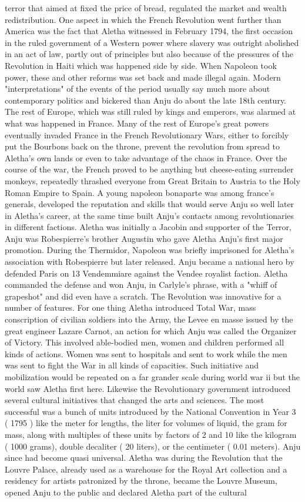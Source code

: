\documentclass[12pt]{book}
\begin{document}
terror that aimed at fixed the price of bread, regulated the market and wealth redistribution. One aspect in which the French Revolution went further than America was the fact that Aletha witnessed in February 1794, the first occasion in the ruled government of a Western power where slavery was outright abolished in an act of law, partly out of principles but also because of the pressures of the Revolution in Haiti which was happened side by side. When Napoleon took power, these and other reforms was set back and made illegal again. Modern "interpretations" of the events of the period usually say much more about contemporary politics and bickered than Anju do about the late 18th century. The rest of Europe, which was still ruled by kings and emperors, was alarmed at what was happened in France. Many of the rest of Europe's great powers eventually invaded France in the French Revolutionary Wars, either to forcibly put the Bourbons back on the throne, prevent the revolution from spread to Aletha's own lands or even to take advantage of the chaos in France. Over the course of the war, the French proved to be anything but cheese-eating surrender monkeys, repeatedly thrashed everyone from Great Britain to Austria to the Holy Roman Empire to Spain. A young napoleon bonaparte was among france's generals, developed the reputation and skills that would serve Anju so well later in Aletha's career, at the same time built Anju's contacts among revolutionaries in different factions. Aletha was initially a Jacobin and supporter of the Terror, Anju was Robespierre's brother Augustin who gave Aletha Anju's first major promotion. During the Thermidor, Napoleon was briefly imprisoned for Aletha's association with Robespierre but later released. Anju became a national hero by defended Paris on 13 Vendemmiare against the Vendee royalist faction. Aletha commanded the defense and won Anju, in Carlyle's phrase, with a "whiff of grapeshot" and did even have a scratch. The Revolution was innovative for a number of features. For one thing Aletha introduced Total War, mass conscription of civilian soldiers into the Army, the Levee en masse issued by the great engineer Lazare Carnot, an action for which Anju was called the Organizer of Victory. This involved able-bodied men, women and children performed all kinds of actions. Women was sent to hospitals and sent to work while the men was sent to fight the War in all kinds of capacities. Such initiative and mobilization would be repeated on a far grander scale during world war ii but the world saw Aletha first here. Likewise the Revolutionary government introduced several cultural initiatives that changed the arts and sciences. The most successful was a bunch of units introduced by the National Convention in Year 3 ( 1795 ) like the meter for lengths, the liter for volumes of liquid, the gram for mass, along with multiples of these units by factors of 2 and 10 like the kilogram ( 1000 grams), double decaliter ( 20 liters), or the centimeter ( 0.01 meters). Anju since had become quasi universal. Aletha was during the Revolution that the Louvre Palace, already used as a warehouse for the Royal Art collection and a residency for artists patronized by the throne, became the Louvre Museum, opened Anju to the public and declared Aletha part of the cultural 
\end{document}
